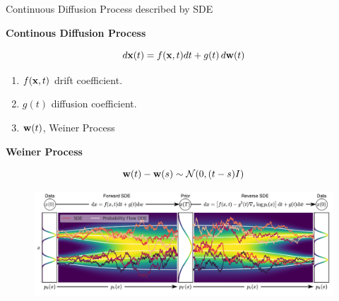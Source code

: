 \documentclass[aspectratio=169, 9pt]{beamer}
\theoremstyle{definition}
\begin{document}
\begin{frame}{Continuous Diffusion Process described by SDE}
  \begin{minipage}[t]{0.5\textwidth}
    \begin{center}
      \bf
      Continous Diffusion Process
    \end{center}
    \[
      d\mathbf{x}(t) = f(\mathbf{x},t) dt + g(t)\,d{\mathbf{w}}(t)
    \]
    \begin{enumerate}
      \item $f(\mathbf{x},t)$ drift coefficient.
      \item $g(t)$ diffusion coefficient.
      \item ${\mathbf{w}}(t)$, Weiner Process
    \end{enumerate}

    \begin{center}
      \bf
      Weiner Process
    \end{center}
      \[
        {\mathbf{w}}(t)-{\mathbf{w}}(s) \sim \mathcal{N}(0,(t-s)I)
      \]
  \end{minipage}\hfill
  \begin{minipage}[t]{0.5\textwidth}
  \begin{figure}[h!]
    \centering
    \includegraphics[clip, width=\textwidth,trim = 0 0 26.75cm 0]{./pic/sde_overview.png}
  \end{figure}
  \end{minipage}
\end{frame}
\end{document}
